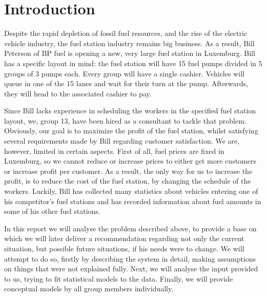 \section{Introduction}
Despite the rapid depletion of fossil fuel resources, and the rise of the electric vehicle industry, the fuel station industry remains big business.
As a result, Bill Peterson of BP fuel is opening a new, very large fuel station in Luxemburg.
Bill has a specific layout in mind: the fuel station will have 15 fuel pumps divided in 5 groups of 3 pumps each.
Every group will have a single cashier.
Vehicles will queue in one of the 15 lanes and wait for their turn at the pump.
Afterwards, they will head to the associated cashier to pay.

Since Bill lacks experience in scheduling the workers in the specified fuel station layout, we, group 13, have been hired as a consultant to tackle that problem.
Obviously, our goal is to maximize the profit of the fuel station, whilst satisfying several requirements made by Bill regarding customer satisfaction.
We are, however, limited in certain aspects.
First of all, fuel prices are fixed in Luxemburg, so we cannot reduce or increase prices to either get more customers or increase profit per customer.
As a result, the only way for us to increase the profit, is to reduce the cost of the fuel station, by changing the schedule of the workers.
Luckily, Bill has collected many statistics about vehicles entering one of his competitor's fuel stations and has recorded information about fuel amounts in some of his other fuel stations.

In this report we will analyse the problem described above, to provide a base on which we will later deliver a recommendation regarding not only the current situation, but possible future situations, if his needs were to change.
We will attempt to do so, firstly by describing the system in detail, making assumptions on things that were not explained fully.
Next, we will analyse the input provided to us, trying to fit statistical models to the data.
Finally, we will provide conceptual models by all group members individually.